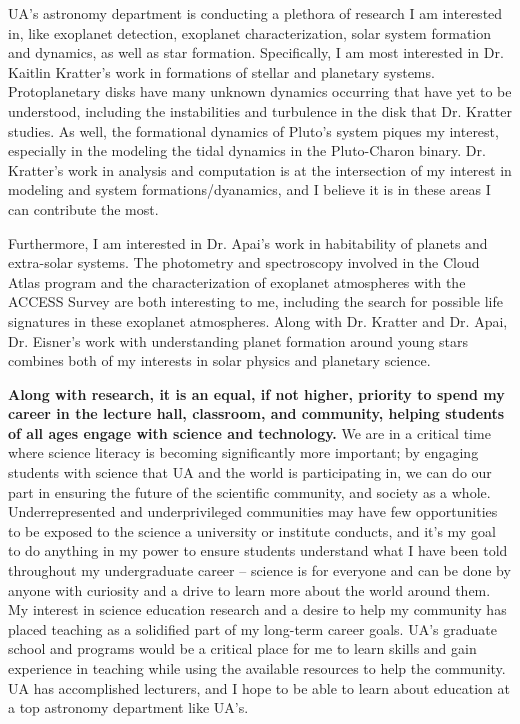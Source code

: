 \documentclass[11pt,letterpaper]{article}
\begin{document}
UA's astronomy department is conducting a plethora of research I am interested in, like exoplanet detection, exoplanet characterization, solar system formation and dynamics, as well as star formation. Specifically, I am most interested in Dr. Kaitlin Kratter's work in formations of stellar and planetary systems. Protoplanetary disks have many unknown dynamics occurring that have yet to be understood, including the instabilities and turbulence in the disk that Dr. Kratter studies. As well, the formational dynamics of Pluto's system piques my interest, especially in the modeling the tidal dynamics in the Pluto-Charon binary. Dr. Kratter's work in analysis and computation is at the intersection of my interest in modeling and system formations/dyanamics, and I believe it is in these areas I can contribute the most.

Furthermore, I am interested in Dr. Apai's work in habitability of planets and extra-solar systems. The photometry and spectroscopy involved in the Cloud Atlas program and the characterization of exoplanet atmospheres with the ACCESS Survey are both interesting to me, including the search for possible life signatures in these exoplanet atmospheres. Along with Dr. Kratter and Dr. Apai, Dr. Eisner's work with understanding planet formation around young stars combines both of my interests in solar physics and planetary science. 

\textbf{Along with research, it is an equal, if not higher, priority to spend my career in the lecture hall, classroom, and community, helping students of all ages engage with science and technology.} We are in a critical time where science literacy is becoming significantly more important; by engaging students with science that UA and the world is participating in, we can do our part in ensuring the future of the scientific community, and society as a whole. Underrepresented and underprivileged communities may have few opportunities to be exposed to the science a university or institute conducts, and it’s my goal to do anything in my power to ensure students understand what I have been told throughout my undergraduate career -- science is for everyone and can be done by anyone with curiosity and a drive to learn more about the world around them. My interest in science education research and a desire to help my community has placed teaching as a solidified part of my long-term career goals. UA’s graduate school and programs would be a critical place for me to learn skills and gain experience in teaching while using the available resources to help the community. UA has accomplished lecturers, and I hope to be able to learn about education at a top astronomy department like UA's.
\end{document}
